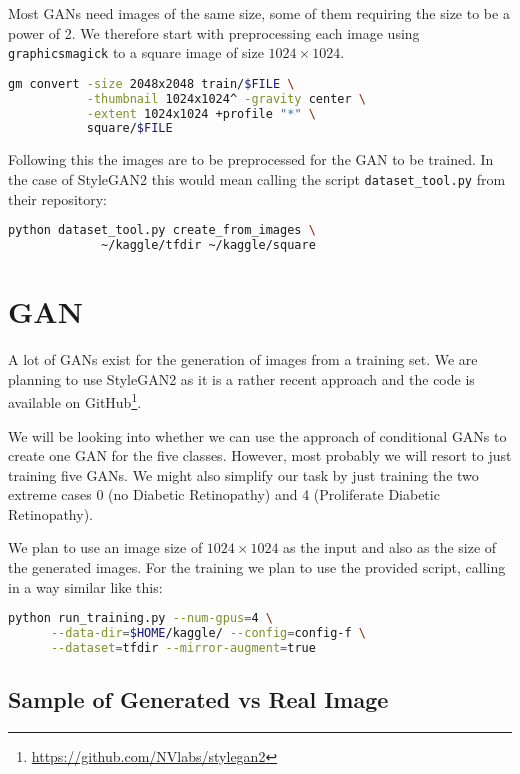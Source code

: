 \documentclass[sigconf,nonacm]{acmart}
\begin{document}
Most GANs need images of the same size, some of them requiring
the size to be a power of 2.
We therefore start with preprocessing each image 
using \texttt{graphicsmagick}
to a square image of size $1024\times1024$.
\begin{lstlisting}[language=bash,basicstyle=\ttfamily\small]
gm convert -size 2048x2048 train/$FILE \
           -thumbnail 1024x1024^ -gravity center \
           -extent 1024x1024 +profile "*" \
           square/$FILE
\end{lstlisting}

Following this the images are to be preprocessed for the GAN
to be trained.
In the case of StyleGAN2 this would mean calling the
script \texttt{dataset\_tool.py} from their repository:
\begin{lstlisting}[language=bash,basicstyle=\ttfamily\small]
python dataset_tool.py create_from_images \
             ~/kaggle/tfdir ~/kaggle/square
\end{lstlisting}
\section{GAN}

A lot of GANs exist for the generation of images from a training set.
We are planning to use
StyleGAN2\cite{stylegan2}
as it is a rather recent approach and the code is available on
GitHub\footnote{\url{https://github.com/NVlabs/stylegan2}}.

We will be looking into whether we can use the approach
of conditional GANs to create one GAN for the five classes.
However, most probably we will resort to just training five
GANs.
We might also simplify our task by just training the two extreme
cases 0 (no Diabetic Retinopathy) and 4 (Proliferate Diabetic Retinopathy).

We plan to use an image size of $1024\times1024$ as the input and
also as the size of the generated images.
For the training we plan to use the provided script, calling
in a way similar like this:
\begin{lstlisting}[language=bash,basicstyle=\ttfamily\small]
python run_training.py --num-gpus=4 \
      --data-dir=$HOME/kaggle/ --config=config-f \
      --dataset=tfdir --mirror-augment=true
\end{lstlisting}

\subsection{Sample of Generated vs Real Image}
\end{document}
